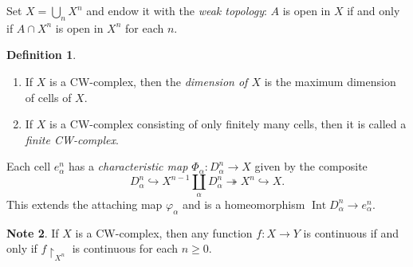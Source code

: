 \documentclass[10pt,letterpaper,cm]{nupset}
\theoremstyle{definition}
\newtheorem{definition}{Definition}[subsection]
\newtheorem{note}[definition]{Note}
\theoremstyle{theorem}
\theoremstyle{remark}
\newcommand{\1}{\mathbb{1}}
\newcommand{\0}{\vec 0}
\DeclareMathOperator{\Int}{Int}
\begin{document}
\begin{enumerate}
Set $X= \bigcup_{n} X^n$ and endow it with the \textit{weak topology}: $A$ is open in $X$ if and only if $A\cap X^n$ is open in $X^n$ for each $n$.
\begin{definition} $ $
\begin{enumerate}
\item If $X$ is a CW-complex, then the \textit{dimension of $X$} is the maximum dimension of cells of $X$.
\item If $X$ is a CW-complex consisting of only finitely many cells, then it is called a \textit{finite CW-complex}.
\end{enumerate}
\end{definition}
Each cell $e_{\alpha}^n$ has a \textit{characteristic map $\Phi_{\alpha} : D_{\alpha}^n \to X$} given by the composite $$D_{\alpha}^n \hookrightarrow X^{n-1} \coprod_{\alpha} D_{\alpha}^n \twoheadrightarrow X^n \hookrightarrow X.$$ This extends the attaching map $\varphi_{\alpha}$ and is a homeomorphism $\Int{D_{\alpha}^n} \to e_{\alpha}^n$.
\end{enumerate}


\begin{note}
If $X$ is a CW-complex, then any function $f: X \to Y$ is continuous if and only if $f\restriction_{X^n}$ is continuous for each $n\geq 0$.
\end{note}
\end{document}
